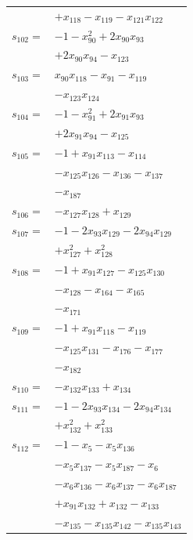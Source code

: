 \begin{longtable}{@{}r@{\;}l@{}}
 & \(\displaystyle +x_{118} -x_{119} -x_{121}x_{122}\) \\[3pt]
\(s_{102}=\) & \(\displaystyle -1 -x_{90}^{2} +2x_{90}x_{93}\) \\
 & \(\displaystyle +2x_{90}x_{94} -x_{123}\) \\[3pt]
\(s_{103}=\) & \(\displaystyle x_{90}x_{118} -x_{91} -x_{119}\) \\
 & \(\displaystyle -x_{123}x_{124}\) \\[3pt]
\(s_{104}=\) & \(\displaystyle -1 -x_{91}^{2} +2x_{91}x_{93}\) \\
 & \(\displaystyle +2x_{91}x_{94} -x_{125}\) \\[3pt]
\(s_{105}=\) & \(\displaystyle -1 +x_{91}x_{113} -x_{114}\) \\
 & \(\displaystyle -x_{125}x_{126} -x_{136} -x_{137}\) \\
 & \(\displaystyle -x_{187}\) \\[3pt]
\(s_{106}=\) & \(\displaystyle -x_{127}x_{128} +x_{129}\) \\[3pt]
\(s_{107}=\) & \(\displaystyle -1 -2x_{93}x_{129} -2x_{94}x_{129}\) \\
 & \(\displaystyle +x_{127}^{2} +x_{128}^{2}\) \\[3pt]
\(s_{108}=\) & \(\displaystyle -1 +x_{91}x_{127} -x_{125}x_{130}\) \\
 & \(\displaystyle -x_{128} -x_{164} -x_{165}\) \\
 & \(\displaystyle -x_{171}\) \\[3pt]
\(s_{109}=\) & \(\displaystyle -1 +x_{91}x_{118} -x_{119}\) \\
 & \(\displaystyle -x_{125}x_{131} -x_{176} -x_{177}\) \\
 & \(\displaystyle -x_{182}\) \\[3pt]
\(s_{110}=\) & \(\displaystyle -x_{132}x_{133} +x_{134}\) \\[3pt]
\(s_{111}=\) & \(\displaystyle -1 -2x_{93}x_{134} -2x_{94}x_{134}\) \\
 & \(\displaystyle +x_{132}^{2} +x_{133}^{2}\) \\[3pt]
\(s_{112}=\) & \(\displaystyle -1 -x_{5} -x_{5}x_{136}\) \\
 & \(\displaystyle -x_{5}x_{137} -x_{5}x_{187} -x_{6}\) \\
 & \(\displaystyle -x_{6}x_{136} -x_{6}x_{137} -x_{6}x_{187}\) \\
 & \(\displaystyle +x_{91}x_{132} +x_{132} -x_{133}\) \\
 & \(\displaystyle -x_{135} -x_{135}x_{142} -x_{135}x_{143}\) \\

\end{longtable}
